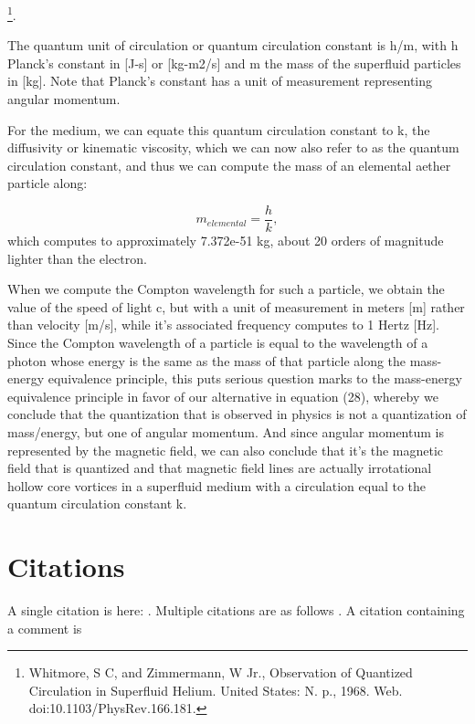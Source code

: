 \documentclass[twoside,final]{article}
\begin{document}
{\footnote{
Whitmore, S C, and Zimmermann, W Jr., Observation of Quantized Circulation in
Superfluid Helium. United States: N. p., 1968. Web. doi:10.1103/PhysRev.166.181.
\par }. 

The quantum unit of circulation or quantum circulation constant is h/m,
with h Planck's constant in [J-s] or [kg-m2/s] and m the mass of the superfluid
particles in [kg].  Note that Planck{}'s constant has a unit of measurement
representing angular momentum.

For the medium, we can equate this quantum circulation constant to k, the
diffusivity or kinematic viscosity, which we can now also refer to as the
quantum circulation constant, and thus we can compute the mass of an elemental
aether particle along:

\begin{equation}
m_{\mathit{elemental}}=\frac h k,
\end{equation}
which computes to approximately 7.372e-51 kg, about 20 orders of magnitude
lighter than the electron. 

When we compute the Compton wavelength for such a particle, we obtain the value
of the speed of light c, but with a unit of measurement in meters [m] rather
than velocity [m/s], while it's associated frequency computes to 1 Hertz [Hz].
Since the Compton wavelength of a particle is equal to the wavelength of a
photon whose energy is the same as the mass of that particle along the
mass-energy equivalence principle, this puts serious question marks to the
mass-energy equivalence principle in favor of our alternative in equation (28),
whereby we conclude that the quantization that is observed in physics is not a
quantization of mass/energy, but one of angular momentum. And since angular
momentum is represented by the magnetic field, we can also conclude that it's
the magnetic field that is quantized and that magnetic field lines are actually
irrotational hollow core vortices in a superfluid medium with a circulation
equal to the quantum circulation constant k. 




\section{Citations}

A single citation is here: \cite{eddy}. Multiple citations are as follows
\cite{bondi,Pez,La2}. A citation containing a comment is \cite[see p.\,5]{eddy}

}
\end{document}
